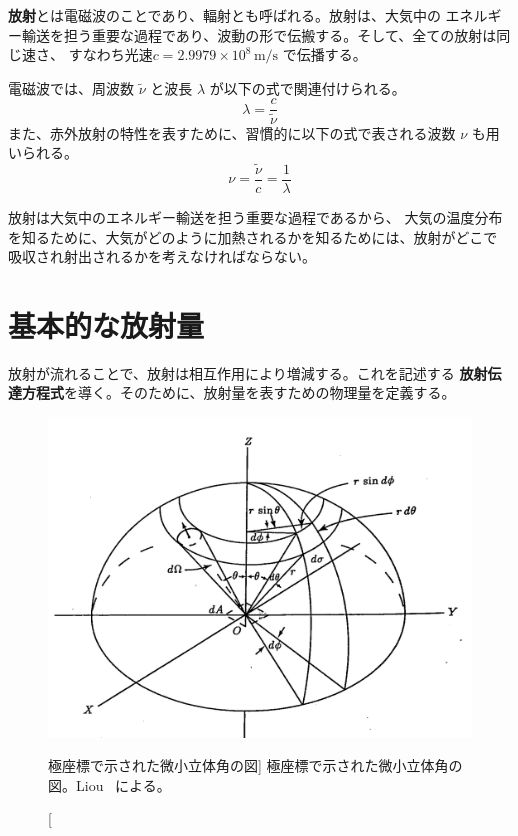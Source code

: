 \documentclass[article,twoside]{dennou777}
\newcommand{\hmunit}[1]{\,\mathrm{#1}}
\newcommand{\hmemph}[1]{\textbf{#1}}
\begin{document}
\hmemph{放射}とは電磁波のことであり、輻射とも呼ばれる\cite{asano}。放射は、大気中の
エネルギー輸送を担う重要な過程であり、波動の形で伝搬する。そして、全ての放射は同じ速さ、
すなわち光速$c=2.9979\times10^8\hmunit{m/s}$ で伝播する。

電磁波では、周波数 $\tilde\nu$ と波長 $\lambda$ が以下の式で関連付けられる。
\begin{equation}
	\lambda=\frac{c}{\tilde\nu}
\end{equation}
また、赤外放射の特性を表すために、習慣的に以下の式で表される波数 $\nu$ も用いられる。
\begin{equation}
	\nu=\frac{\tilde\nu}{c}=\frac{1}{\lambda}
\end{equation}

放射は大気中のエネルギー輸送を担う重要な過程であるから、
大気の温度分布を知るために、大気がどのように加熱されるかを知るためには、放射がどこで
吸収され射出されるかを考えなければならない。

\section{基本的な放射量}

放射が流れることで、放射は相互作用により増減する。これを記述する
\hmemph{放射伝達方程式}を導く。そのために、放射量を表すための物理量を定義する。

\begin{figure}[t]
	\includegraphics[width=\linewidth]{eq2.jpg}
	\caption
		[極座標で示された微小立体角の図]
		{極座標で示された微小立体角の図。Liou~\cite{liou} による。}
\end{figure}
\end{document}
